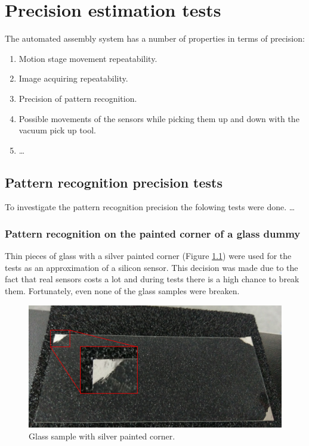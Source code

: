 \chapter{Precision estimation tests}
The automated assembly system has a number of properties in terms of precision:
\begin{enumerate}
\item Motion stage movement repeatability.
\item Image acquiring repeatability.
\item Precision of pattern recognition.
\item Possible movements of the sensors while picking them up and down with the vacuum pick up tool.
\item \ldots
\end{enumerate}

\section{Pattern recognition precision tests}

To investigate the pattern recognition precision the folowing tests were done.  \ldots
\subsection{Pattern recognition on the painted corner of a glass dummy}
Thin pieces of glass with a silver painted corner (Figure \ref{fig:painted_corner}) were used for the tests as an approximation of a silicon sensor. This decision was made due to the fact that real sensors costs a lot and during tests there is a high chance to break them. Fortunately, even none of the glass samples were breaken.

\begin{figure}[ht]\centering
\includegraphics[width=0.8\linewidth]{Data/Precision_tests/Painted_corner.png}
\caption{Glass sample with silver painted corner.}
\label{fig:painted_corner}
\end{figure}

